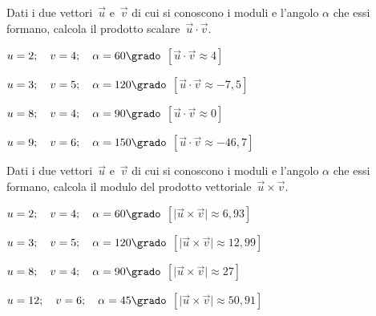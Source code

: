 \begin{esercizio}
\label{ese:vett.8}
Dati i due vettori~$\vec{u}$ e~$\vec{v}$ di cui si conoscono i moduli e 
l'angolo $\alpha$ che essi formano, 
calcola il prodotto scalare~$\vec{u} \cdot \vec{v}$.
\begin{enumeratea}
\item $u=2; \quad v=4; \quad \alpha=60\grado$ 
 \hfill $\left[\vec{u} \cdot \vec{v} \approx 4\right]$
\item $u=3; \quad v=5; \quad \alpha=120\grado$ 
 \hfill $\left[\vec{u} \cdot \vec{v} \approx -7,5\right]$
\item $u=8; \quad v=4; \quad \alpha=90\grado$ 
 \hfill $\left[\vec{u} \cdot \vec{v} \approx 0\right]$
\item $u=9; \quad v=6; \quad \alpha=150\grado$ 
 \hfill $\left[\vec{u} \cdot \vec{v} \approx -46,7\right]$
\end{enumeratea}
\end{esercizio}

\begin{esercizio}
\label{ese:vett.9}
Dati i due vettori~$\vec{u}$ e~$\vec{v}$ di cui si conoscono i moduli e 
l'angolo $\alpha$ che essi formano, 
calcola il modulo del prodotto vettoriale~$\vec{u} \times \vec{v}$.
\begin{enumeratea}
\item $u=2; \quad v=4; \quad \alpha=60\grado$ 
 \hfill $\left[\lvert\vec{u} \times \vec{v}\rvert \approx 6,93\right]$
\item $u=3; \quad v=5; \quad \alpha=120\grado$ 
 \hfill $\left[\lvert\vec{u} \times \vec{v}\rvert \approx 12,99\right]$
\item $u=8; \quad v=4; \quad \alpha=90\grado$ 
 \hfill $\left[\lvert\vec{u} \times \vec{v}\rvert \approx 27\right]$
\item $u=12; \quad v=6; \quad \alpha=45\grado$ 
 \hfill $\left[\lvert\vec{u} \times \vec{v}\rvert \approx 50,91\right]$
\end{enumeratea}
\end{esercizio}

